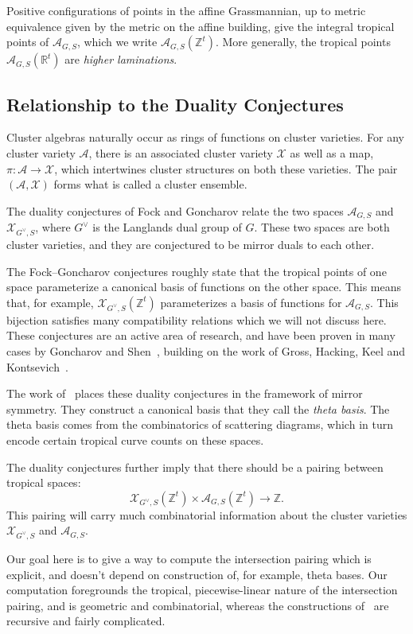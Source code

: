 \documentclass[10pt]{amsart}
\theoremstyle{definition}
\newcommand{\Z}{\mathbb{Z}}
\newcommand{\Zt}{\mathbb{Z}^t}
\newcommand{\Rt}{\mathbb{R}^t}
\newcommand{\A}{\mathcal{A}}
\newcommand{\X}{\mathcal{X}}
\newcommand{\vG}{G^\vee}
\begin{document}
Positive configurations of points in the affine Grassmannian, up to metric equivalence given by the metric on the affine building, give the integral tropical points of $\A_{G,S}$, which we write $\A_{G,S}(\Zt)$. More generally, the tropical points $\A_{G,S}(\Rt)$ are \emph{higher laminations}.

\subsection{Relationship to the Duality Conjectures}

Cluster algebras naturally occur as rings of functions on cluster varieties. For any cluster variety $\A$, there is an associated cluster variety $\X$ as well as a map, $\pi: \A \rightarrow \X$, which intertwines cluster structures on both these varieties. The pair $(\A,\X)$ forms what is called a cluster ensemble.

The duality conjectures of Fock and Goncharov relate the two spaces $\A_{G,S}$ and $\X_{\vG,S}$, where $\vG$ is the Langlands dual group of $G$. These two spaces are both cluster varieties, and they are conjectured to be mirror duals to each other.

The Fock--Goncharov conjectures roughly state that the tropical points of one space parameterize a canonical basis of functions on the other space. This means that, for example, $\X_{\vG,S}(\Zt)$ parameterizes a basis of functions for $\A_{G,S}$. This bijection satisfies many compatibility relations which we will not discuss here. These conjectures are an active area of research, and have been proven in many cases by Goncharov and Shen~\cite{GS2}, building on the work of Gross, Hacking, Keel and Kontsevich~\cite{GHKK}.

The work of~\cite{GHKK} places these duality conjectures in the framework of mirror symmetry. They construct a canonical basis that they call the \emph{theta basis}. The theta basis comes from the combinatorics of scattering diagrams, which in turn encode certain tropical curve counts on these spaces.

The duality conjectures further imply that there should be a pairing between tropical spaces:
\[
\X_{\vG,S}(\Zt) \times \A_{G,S}(\Zt) \rightarrow \Z.
\]
This pairing will carry much combinatorial information about the cluster varieties $\X_{\vG,S}$ and $\A_{G,S}$.

Our goal here is to give a way to compute the intersection pairing which is explicit, and doesn't depend on construction of, for example, theta bases. Our computation foregrounds the tropical, piecewise-linear nature of the intersection pairing, and is geometric and combinatorial, whereas the constructions of~\cite{GHKK} are recursive and fairly complicated.
\end{document}
